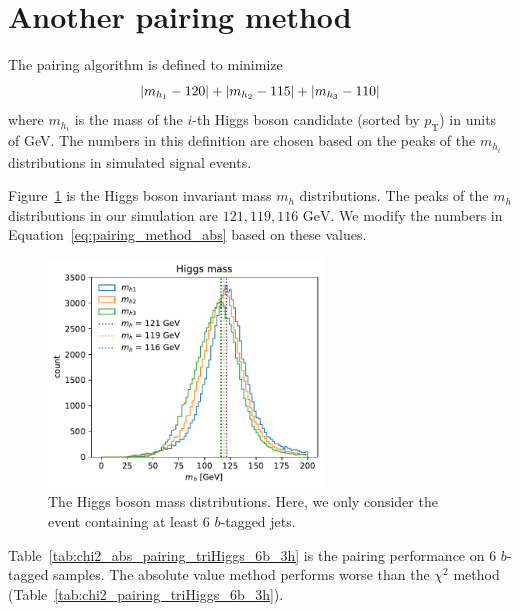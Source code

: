 \documentclass[12pt]{article}
\begin{document}
\section{Another pairing method}%
\label{sec:another_pairing_method}
	The pairing algorithm is defined to minimize
	\begin{equation}\label{eq:pairing_method_abs}
		\abs{m_{h_1} - 120} + \abs{m_{h_2} - 115} + \abs{m_{h_3} - 110}
	\end{equation}
	where $m_{h_i}$ is the mass of the $i$-th Higgs boson candidate (sorted by $p_{\text{T}}$) in units of GeV. The numbers in this definition are chosen based on the peaks of the $m_{h_i}$ distributions in simulated signal events.

	Figure~\ref{fig:mh_distribution_6b} is the Higgs boson invariant mass $m_h$ distributions. The peaks of the $m_{h}$ distributions in our simulation are $121, 119, 116 \text{ GeV}$. We modify the numbers in Equation~\ref{eq:pairing_method_abs} based on these values.
	\begin{figure}[htpb] 
		\centering
        \includegraphics[width=0.65\textwidth]{mh_distribution_6b.pdf} 
		\caption{The Higgs boson mass distributions. Here, we only consider the event containing at least 6 $b$-tagged jets.}
		\label{fig:mh_distribution_6b}
	\end{figure}
	Table~\ref{tab:chi2_abs_pairing_triHiggs_6b_3h} is the pairing performance on 6 $b$-tagged samples. The absolute value method performs worse than the $\chi^2$ method (Table~\ref{tab:chi2_pairing_triHiggs_6b_3h}).
\end{document}
